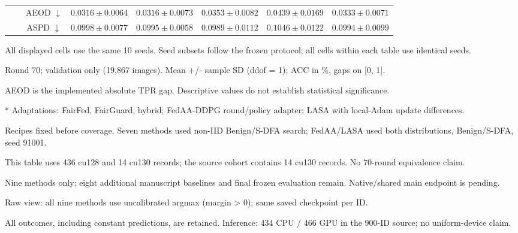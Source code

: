 \begin{table}[t]
{\begin{tabular}{l|l|c|ccccc}
 &  & AEOD $\downarrow$ & $0.0316 \pm 0.0064$ & $0.0316 \pm 0.0073$ & $0.0353 \pm 0.0082$ & $0.0439 \pm 0.0169$ & $0.0333 \pm 0.0071$ \\
 &  & ASPD $\downarrow$ & $0.0998 \pm 0.0077$ & $0.0995 \pm 0.0058$ & $0.0989 \pm 0.0112$ & $0.1046 \pm 0.0122$ & $0.0994 \pm 0.0099$ \\
\hline\hline
\end{tabular}}
\par\smallskip
\begin{minipage}{\textwidth}\scriptsize
All displayed cells use the same 10 seeds. Seed subsets follow the frozen protocol; all cells within each table use identical seeds.\par
Round 70; validation only (19,867 images). Mean +/- sample SD (ddof = 1); ACC in \%, gaps on [0, 1].\par
AEOD is the implemented absolute TPR gap. Descriptive values do not establish statistical significance.\par
* Adaptations: FairFed, FairGuard, hybrid; FedAA-DDPG round/policy adapter; LASA with local-Adam update differences.\par
Recipes fixed before coverage. Seven methods used non-IID Benign/S-DFA search; FedAA/LASA used both distributions, Benign/S-DFA, seed 91001.\par
This table uses 436 cu128 and 14 cu130 records; the source cohort contains 14 cu130 records. No 70-round equivalence claim.\par
Nine methods only; eight additional manuscript baselines and final frozen evaluation remain. Native/shared main endpoint is pending.\par
Raw view: all nine methods use uncalibrated argmax (margin > 0); same saved checkpoint per ID.\par
All outcomes, including constant predictions, are retained. Inference: 434 CPU / 466 GPU in the 900-ID source; no uniform-device claim.\par
\end{minipage}
\end{table}
